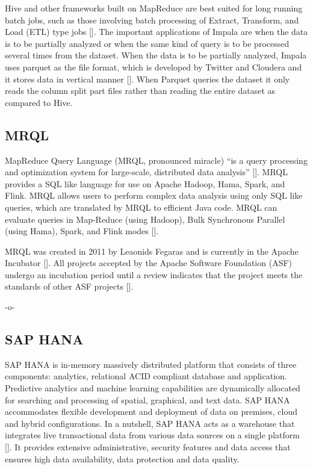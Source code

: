 Hive and other frameworks built on MapReduce are best suited for long
running batch jobs, such as those involving batch processing of
Extract, Transform, and Load (ETL) type
jobs [\cite{www-impala-cloudera}].  The important applications of Impala
are when the data is to be partially analyzed or when the same kind of
query is to be processed several times from the dataset. When the data
is to be partially analyzed, Impala uses parquet as the file format,
which is developed by Twitter and Cloudera and it stores data in
vertical manner [\cite{www-impala-beginner}]. When Parquet queries the
dataset it only reads the column split part files rather than reading
the entire dataset as compared to Hive.
     
\subsection{MRQL}

MapReduce Query Language (MRQL, pronounced miracle) ``is a query
processing and optimization system for large-scale, distributed data
analysis'' [\cite{www-apachemrql}]. MRQL provides a SQL like language
for use on Apache Hadoop, Hama, Spark, and Flink.  MRQL allows users
to perform complex data analysis using only SQL like queries, which
are translated by MRQL to efficient Java code. MRQL can evaluate
queries in Map-Reduce (using Hadoop), Bulk Synchronous Parallel (using
Hama), Spark, and Flink modes [\cite{www-apachemrql}].

MRQL was created in 2011 by Leaonids Fegaras and is currently in the
Apache Incubator [\cite{www-mrqlhadoop}].  All projects accepted by the
Apache Software Foundation (ASF) undergo an incubation period until a
review indicates that the project meets the standards of other ASF
projects [\cite{www-apacheincubator}].

     -o-

\subsection{SAP HANA}

SAP HANA is in-memory massively distributed platform that consists of
three components: analytics, relational ACID compliant database and
application\cite{www-sap-hana}. Predictive analytics and machine
learning capabilities are dynamically allocated for searching and
processing of spatial, graphical, and text data.  SAP HANA
accommodates flexible development and deployment of data on premises,
cloud and hybrid configurations.  In a nutshell, SAP HANA acts as a
warehouse that integrates live transactional data from various data
sources on a single platform [\cite{olofson-2014}]. It provides
extensive administrative, security features and data access that
ensures high data availability, data protection and data quality.


